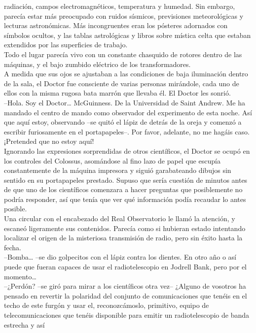 radiación, campos electromagnéticos, temperatura y humedad. Sin embargo,
parecía estar más preocupado con ruidos sísmicos, previsiones
meteorológicas y lecturas astronómicas. Más incongruentes eran los
pósteres adornados con símbolos ocultos, y las tablas astrológicas y
libros sobre mística celta que estaban extendidos por las superficies de
trabajo.\\
Todo el lugar parecía vivo con un constante chasquido de rotores dentro
de las máquinas, y el bajo zumbido eléctrico de los transformadores.\\
A medida que sus ojos se ajustaban a las condiciones de baja iluminación
dentro de la sala, el Doctor fue consciente de varias personas
mirándole, cada uno de ellos con la misma rugosa bata marrón que llevaba
él. El Doctor les sonrió.\\
--Hola. Soy el Doctor\ldots{} McGuinness. De la Universidad de Saint
Andrew. Me ha mandado el centro de mando como observador del experimento
de esta noche. Así que aquí estoy, observando --se quitó el lápiz de
detrás de la oreja y comenzó a escribir furiosamente en el
portapapeles--. Por favor, adelante, no me hagáis caso. ¡Pretended que
no estoy aquí!\\
Ignorando las expresiones sorprendidas de otros científicos, el Doctor
se ocupó en los controles del Colossus, asomándose al fino lazo de papel
que escupía constantemente de la máquina impresora y siguió garabateando
dibujos sin sentido en su portapapeles prestado. Supuso que sería
cuestión de minutos antes de que uno de los científicos comenzara a
hacer preguntas que posiblemente no podría responder, así que tenía que
ver qué información podía recaudar lo antes posible.\\
Una circular con el encabezado del Real Observatorio le llamó la
atención, y escaneó ligeramente sus contenidos. Parecía como si hubieran
estado intentando localizar el origen de la misteriosa transmisión de
radio, pero sin éxito hasta la fecha.\\
--Bomba\ldots{} --se dio golpecitos con el lápiz contra los dientes. En
otro año o así puede que fueran capaces de usar el radiotelescopio en
Jodrell Bank, pero por el momento\ldots{}\\
--¿Perdón? --se giró para mirar a los científicos otra vez-- ¿Alguno de
vosotros ha pensado en revertir la polaridad del conjunto de
comunicaciones que tenéis en el techo de este furgón y usar el,
reconozcámoslo, primitivo, equipo de telecomunicaciones que tenéis
disponible para emitir un radiotelescopio de banda estrecha y así
